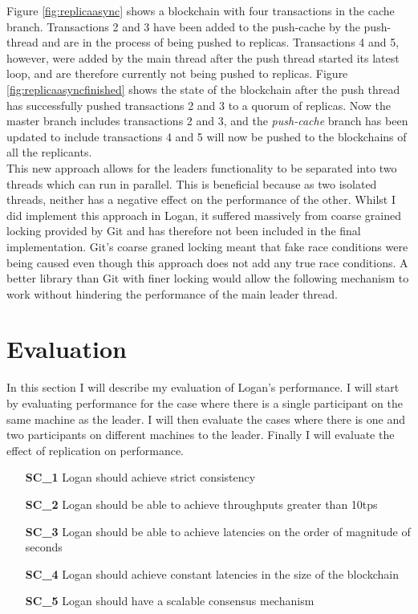 \documentclass[12pt,a4paper,twoside,openright]{report}
\begin{document}
	Figure \ref{fig:replicaasync} shows a blockchain with four transactions in the cache branch.
	Transactions 2 and 3 have been added to the push-cache by the push-thread and are in the process of being pushed to replicas. 
	Transactions 4 and 5, however, were added by the main thread after the push thread started its latest loop, and are therefore currently not being pushed to replicas.
	Figure \ref{fig:replicaasyncfinished} shows the state of the blockchain after the push thread has successfully pushed transactions 2 and 3 to a quorum of replicas.
	Now the master branch includes transactions 2 and 3, and the \textit{push-cache} branch has been updated to include transactions 4 and 5 will now be pushed to the blockchains of all the replicants.\\

	This new approach allows for the leaders functionality to be separated into two threads which can run in parallel. 
	This is beneficial because as two isolated threads, neither has a negative effect on the performance of the other.
	Whilst I did implement this approach in Logan, it suffered massively from coarse grained locking provided by Git and has therefore not been included in the final implementation.
	Git's coarse graned locking meant that fake race conditions were being caused even though this approach does not add any true race conditions.
	A better library than Git with finer locking would allow the following mechanism to work without hindering the performance of the main leader thread.

	\chapter{Evaluation}
	In this section I will describe my evaluation of Logan's performance.
	I will start by evaluating performance for the case where there is a single participant on the same machine as the leader. 
	I will then evaluate the cases where there is one and two participants on different machines to the leader.
	Finally I will evaluate the effect of replication on performance.
	\begin{itemize}
		\setlength{\itemindent}{2em}
		\item[\textbf{SC\_1}] Logan should achieve strict consistency
		\item[\textbf{SC\_2}] Logan should be able to achieve throughputs greater than 10tps
		\item[\textbf{SC\_3}] Logan should be able to achieve latencies on the order of magnitude of seconds
		\item[\textbf{SC\_4}] Logan should achieve constant latencies in the size of the blockchain
		\item[\textbf{SC\_5}] Logan should have a scalable consensus mechanism 
	\end{itemize}
\end{document}
